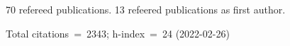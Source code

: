 70 refereed publications. 13 refeered publications as first author.

Total citations~=~2343; h-index~=~24 (2022-02-26)